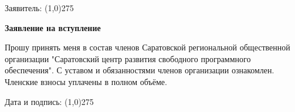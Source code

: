 \documentclass[notitlepage]{article}
\begin{document}
\begin{flushright}Заявитель: \line(1,0){275} \end{flushright}
\vspace{1cm}
\begin{center}\textbf{Заявление на вступление}\end{center}
Прошу принять меня в состав членов Саратовской региональной общественной
организации "Саратовский центр развития свободного программного
обеспечения". С уставом и обязанностями членов организации ознакомлен.
Членские взносы уплачены в полном объёме.
\vspace{1cm}
\begin{flushright}Дата и подпись: \line(1,0){275} \end{flushright}
\end{document}
